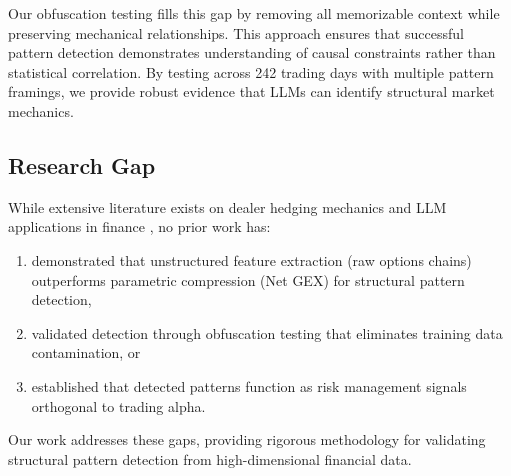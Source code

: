 Our obfuscation testing fills this gap by removing all memorizable context while preserving mechanical relationships. This approach ensures that successful pattern detection demonstrates understanding of causal constraints rather than statistical correlation. By testing across 242 trading days with multiple pattern framings, we provide robust evidence that LLMs can identify structural market mechanics.

\subsection{Research Gap}

While extensive literature exists on dealer hedging mechanics \citep{ni2005stock,garleanu2009demand} and LLM applications in finance \citep{lopez2023can,chen2023fingpt}, no prior work has:
\begin{enumerate}
    \item demonstrated that unstructured feature extraction (raw options chains) outperforms parametric compression (Net GEX) for structural pattern detection,
    \item validated detection through obfuscation testing that eliminates training data contamination, or
    \item established that detected patterns function as risk management signals orthogonal to trading alpha.
\end{enumerate}
Our work addresses these gaps, providing rigorous methodology for validating structural pattern detection from high-dimensional financial data.
